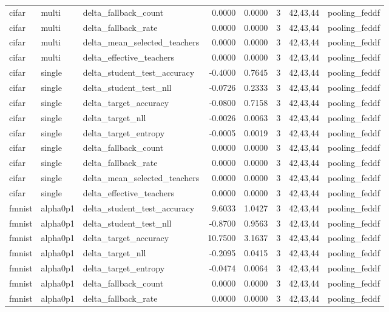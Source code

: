 \begin{tabular}{lllrrrll}
cifar & multi & delta\_fallback\_count & 0.0000 & 0.0000 & 3 & 42,43,44 & pooling\_feddf \\
cifar & multi & delta\_fallback\_rate & 0.0000 & 0.0000 & 3 & 42,43,44 & pooling\_feddf \\
cifar & multi & delta\_mean\_selected\_teachers & 0.0000 & 0.0000 & 3 & 42,43,44 & pooling\_feddf \\
cifar & multi & delta\_effective\_teachers & 0.0000 & 0.0000 & 3 & 42,43,44 & pooling\_feddf \\
cifar & single & delta\_student\_test\_accuracy & -0.4000 & 0.7645 & 3 & 42,43,44 & pooling\_feddf \\
cifar & single & delta\_student\_test\_nll & -0.0726 & 0.2333 & 3 & 42,43,44 & pooling\_feddf \\
cifar & single & delta\_target\_accuracy & -0.0800 & 0.7158 & 3 & 42,43,44 & pooling\_feddf \\
cifar & single & delta\_target\_nll & -0.0026 & 0.0063 & 3 & 42,43,44 & pooling\_feddf \\
cifar & single & delta\_target\_entropy & -0.0005 & 0.0019 & 3 & 42,43,44 & pooling\_feddf \\
cifar & single & delta\_fallback\_count & 0.0000 & 0.0000 & 3 & 42,43,44 & pooling\_feddf \\
cifar & single & delta\_fallback\_rate & 0.0000 & 0.0000 & 3 & 42,43,44 & pooling\_feddf \\
cifar & single & delta\_mean\_selected\_teachers & 0.0000 & 0.0000 & 3 & 42,43,44 & pooling\_feddf \\
cifar & single & delta\_effective\_teachers & 0.0000 & 0.0000 & 3 & 42,43,44 & pooling\_feddf \\
fmnist & alpha0p1 & delta\_student\_test\_accuracy & 9.6033 & 1.0427 & 3 & 42,43,44 & pooling\_feddf \\
fmnist & alpha0p1 & delta\_student\_test\_nll & -0.8700 & 0.9563 & 3 & 42,43,44 & pooling\_feddf \\
fmnist & alpha0p1 & delta\_target\_accuracy & 10.7500 & 3.1637 & 3 & 42,43,44 & pooling\_feddf \\
fmnist & alpha0p1 & delta\_target\_nll & -0.2095 & 0.0415 & 3 & 42,43,44 & pooling\_feddf \\
fmnist & alpha0p1 & delta\_target\_entropy & -0.0474 & 0.0064 & 3 & 42,43,44 & pooling\_feddf \\
fmnist & alpha0p1 & delta\_fallback\_count & 0.0000 & 0.0000 & 3 & 42,43,44 & pooling\_feddf \\
fmnist & alpha0p1 & delta\_fallback\_rate & 0.0000 & 0.0000 & 3 & 42,43,44 & pooling\_feddf \\

\end{tabular}
